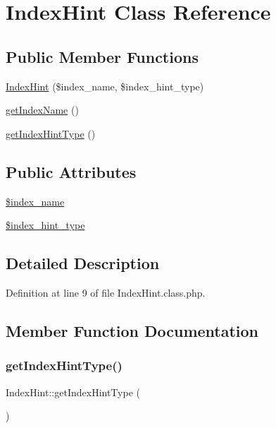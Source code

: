 \hypertarget{classIndexHint}{}\section{Index\+Hint Class Reference}
\label{classIndexHint}
\subsection*{Public Member Functions}
\begin{DoxyCompactItemize}
\item 
\hyperlink{classIndexHint_a31e42ec769a024c036e4f425fc0989cf}{Index\+Hint} (\$index\+\_\+name, \$index\+\_\+hint\+\_\+type)
\item 
\hyperlink{classIndexHint_a2e70ba0a6a8059eacec611a6e3a1fbff}{get\+Index\+Name} ()
\item 
\hyperlink{classIndexHint_afcf5b8d00ff142f4f1328c434ee5f344}{get\+Index\+Hint\+Type} ()
\end{DoxyCompactItemize}
\subsection*{Public Attributes}
\begin{DoxyCompactItemize}
\item 
\hyperlink{classIndexHint_a72e2ec1c8ae97c974642bf4342febc60}{\$index\+\_\+name}
\item 
\hyperlink{classIndexHint_a04d23166dfd4b7490a69b678e2826a32}{\$index\+\_\+hint\+\_\+type}
\end{DoxyCompactItemize}


\subsection{Detailed Description}


Definition at line 9 of file Index\+Hint.\+class.\+php.



\subsection{Member Function Documentation}
\mbox{\label{classIndexHint_afcf5b8d00ff142f4f1328c434ee5f344}} 
\subsubsection{\texorpdfstring{get\+Index\+Hint\+Type()}{getIndexHintType()}}
{\footnotesize\ttfamily Index\+Hint\+::get\+Index\+Hint\+Type (\begin{DoxyParamCaption}{ }\end{DoxyParamCaption})}



